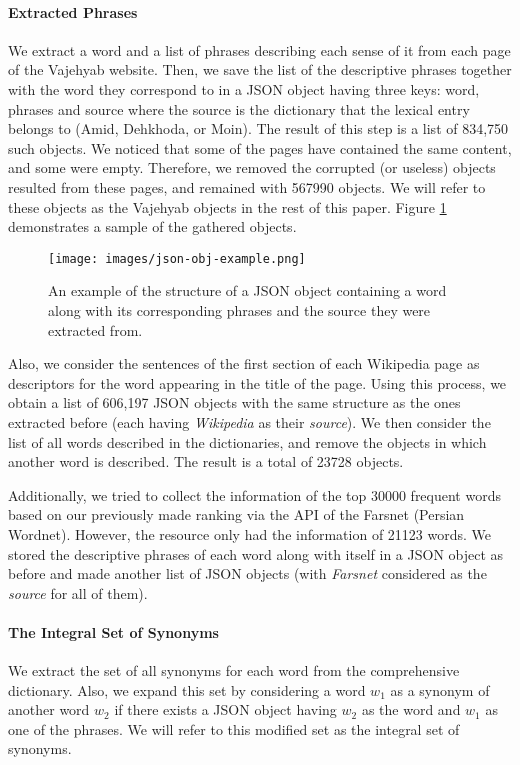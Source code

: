 \documentclass{article}
\begin{document}
\paragraph{Extracted Phrases}
We extract a word and a list of phrases describing each sense of it from each page of the Vajehyab website. Then, we save the list of the descriptive phrases together with the word they correspond to in a JSON object having three keys: word, phrases and source where the source is the dictionary that the lexical entry belongs to (Amid, Dehkhoda, or Moin). The result of this step is a list of 834,750 such objects. We noticed that some of the pages have contained the same content, and some were empty. Therefore, we removed the corrupted (or useless) objects resulted from these pages, and remained with 567990 objects. We will refer to these objects as the Vajehyab objects in the rest of this paper.
Figure \ref{fig:json-obj-ex} demonstrates a sample of the gathered objects.
\begin{figure}[h]
	\centering
	\caption{An example of the structure of a JSON object containing a  word along with its corresponding phrases and the source they were extracted from.}
	\texttt{[image: images/json-obj-example.png]}
	\label{fig:json-obj-ex}
\end{figure}

Also, we consider the sentences of the first section of each Wikipedia page as descriptors for the word appearing in the title of the page.
 Using this process, we obtain a list of 606,197 JSON objects with the same structure as the ones extracted before (each having \textit{Wikipedia} as their \textit{source}). We then consider the list of all words described in the dictionaries, and remove the objects in which another word is described. The result is a total of 23728 objects.

Additionally, we tried to collect the information of the top 30000 frequent words based on our previously made ranking via the API of the Farsnet (Persian Wordnet). However, the resource only had the information of 21123 words. We stored the descriptive phrases of each word along with itself in a JSON object as before and made another list of JSON objects (with \textit{Farsnet} considered as the \textit{source} for all of them). 
\paragraph{The Integral Set of Synonyms}
We extract the set of all synonyms for each word from the comprehensive dictionary.
Also, we expand this set by considering a word $w_1$ as a synonym of another word $w_2$ if there exists a JSON object having $w_2$ as the word and $w_1$ as one of the phrases. We will refer to this modified set as the integral set of synonyms.
\end{document}
